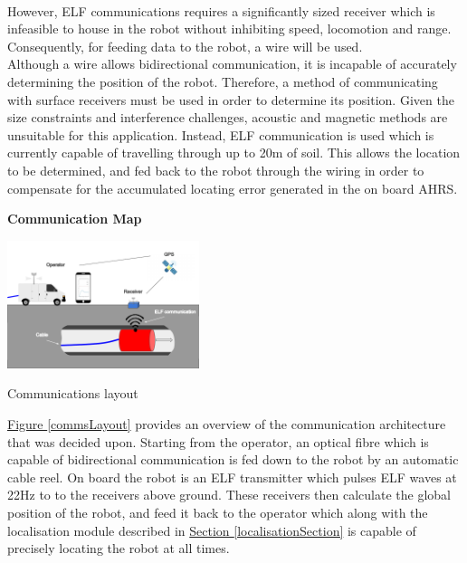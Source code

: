 \documentclass[11pt]{article}		%
\newcommand{\supercite}[1]{\textsuperscript{\cite{#1}}}		%
\newcommand{\figref}[1]{\hyperref[#1]{Figure \ref*{#1}}}    %
\newcommand{\sectref}[1]{\hyperref[#1]{Section \ref*{#1}}}     %
\begin{document}
	     	However, ELF communications requires a significantly sized receiver\supercite{elfreceiversize} which is infeasible to house in the robot without inhibiting speed, locomotion and range. 
	     	Consequently, for feeding data to the robot, a wire will be used.
	        \\ 
	        \hspace*{2ex}Although a wire allows bidirectional communication, it is incapable of accurately determining the position of the robot. 
	        Therefore, a method of communicating with surface receivers must be used in order to determine its position. 
	        Given the size constraints and interference challenges, acoustic and magnetic methods are unsuitable for this application. 
	        Instead, ELF communication is used which is currently capable of travelling through up to 20m of soil. 
	        This allows the location to be determined, and fed back to the robot through the wiring in order to compensate for the accumulated locating error generated in the on board AHRS.
			
			\pagebreak
			
	        \textbf{Communication Map}
   	    	\begin{floatingfigure}[r]{0.45\textwidth}
   				\centering
   				\includegraphics[width=0.42\textwidth]{comms layout}
   				\caption{Communications layout}
   				\label{commsLayout}
   			\end{floatingfigure}
	        \figref{commsLayout} provides an overview of the communication architecture that was decided upon. 
	        Starting from the operator, an optical fibre which is capable of bidirectional communication is fed down to the robot by an automatic cable reel. 
	        On board the robot is an ELF transmitter which pulses ELF waves at 22Hz to to the receivers above ground. 
	        These receivers then calculate the global position of the robot, and feed it back to the operator which along with the localisation module described in \sectref{localisationSection} is capable of precisely locating the robot at all times.
			    
\end{document}
